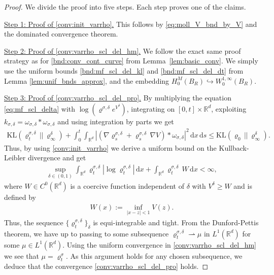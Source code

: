 \documentclass[reqno, 11pt]{amsart}
\numberwithin{equation}{section}
\theoremstyle{definition}
\begin{document}
\begin{proof}
    We divide the proof into five steps. Each step proves one of the claims.
    
    \underline{Step 1: Proof of \ref{conv:init_varrho}.} This follows by \eqref{eq:moll_V_bnd_by_V} and the dominated convergence theorem.
    
    \underline{Step 2: Proof of \ref{conv:varrho_scl_del_hm}.} We follow the exact same proof strategy as for \ref{bnd:conv_cont_curve} from Lemma~\ref{lem:basic_conv}. We simply use the uniform bounds \ref{bnd:mf_scl_del_kl} and \ref{bnd:mf_scl_del_dt} from Lemma \ref{lem:unif_bnds_approx}, and the embedding $H_0^{M}(B_R)\hookrightarrow W_0^{1,\infty}(B_R)$.
    
    \underline{Step 3: Proof of \ref{conv:varrho_scl_del_pro}.}
    By multiplying the equation \eqref{eq:mf_scl_delta} with $\log(\varrho^{\sigma,\delta}e^{V^\delta})$, integrating on $[0,t]\times\mathbb{R}^{d}$, exploiting $k_{\sigma,\delta}=\omega_{\sigma,\delta}\ast\omega_{\sigma,\delta}$ and using integration by parts we get
    \begin{align*}
        \mathrm{KL}(\varrho_t^{\sigma,\delta}\,||\, \varrho_\infty^\delta) + \int_0^t \int_{\mathbb{R}^{d}} |(\nabla \varrho_s^{\sigma,\delta} + \varrho_s^{\sigma,\delta} \, \nabla V)\ast\omega_{\sigma,\delta}|^2 \,\mathrm{d} x\,\mathrm{d} s \leq \mathrm{KL}(\varrho_0 \,||\,\varrho_\infty^\delta).
    \end{align*}
    Thus, by using \ref{conv:init_varrho} we derive a uniform bound on the Kullback-Leibler divergence and get
    \begin{align*}
        \sup_{\delta\in (0,1)}\int_{\mathbb{R}^{d}}\varrho_t^{\sigma,\delta}|\log \varrho_t^{\sigma,\delta}|\,\mathrm{d} x
        +\int_{\mathbb{R}^{d}}\varrho_t^{\sigma,\delta}\, W\,\mathrm{d} x
        <\infty,
    \end{align*}
    where $W\in C^0(\mathbb{R}^{d})$ is a coercive function independent of $\delta$ with $V^\delta\geq W$ and is defined by
    \begin{align*}
        W(x):=\inf_{|x-z|<1} V(z).
    \end{align*}
    Thus, the sequence $\{\varrho_t^{\sigma,\delta}\}_\delta$ is equi-integrable and tight. From the Dunford-Pettis theorem, we have up to passing to some subsequence $\varrho_t^{\sigma,\delta}\rightharpoonup \mu$ in $L^1(\mathbb{R}^{d})$ for some $\mu\in L^1(\mathbb{R}^{d})$. Using the uniform convergence in \ref{conv:varrho_scl_del_hm} we see that $\mu=\varrho_t^\sigma$. As this argument holds for any chosen subsequence, we deduce that the convergence \ref{conv:varrho_scl_del_pro} holds.
    

\end{proof}
\end{document}

